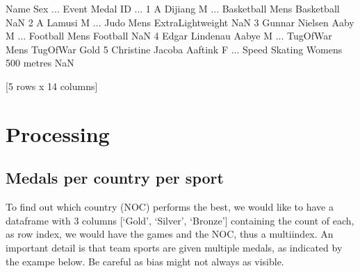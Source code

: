 \documentclass[letterpaper,10pt,english]{jupyterBook}
\begin{document}
\begin{sphinxVerbatim}[commandchars=\\\{\}]
  
\end{sphinxVerbatim}

\begin{sphinxVerbatim}[commandchars=\\\{\}]
                        Name Sex  ...                             Event  Medal
ID                                ...                                         
1                  A Dijiang   M  ...       Basketball Men\PYGZsq{}s Basketball    NaN
2                   A Lamusi   M  ...      Judo Men\PYGZsq{}s Extra\PYGZhy{}Lightweight    NaN
3        Gunnar Nielsen Aaby   M  ...           Football Men\PYGZsq{}s Football    NaN
4       Edgar Lindenau Aabye   M  ...       Tug\PYGZhy{}Of\PYGZhy{}War Men\PYGZsq{}s Tug\PYGZhy{}Of\PYGZhy{}War   Gold
5   Christine Jacoba Aaftink   F  ...  Speed Skating Women\PYGZsq{}s 500 metres    NaN

[5 rows x 14 columns]
\end{sphinxVerbatim}


\section{Processing}
\label{\detokenize{c7_case_studies/Olympics:processing}}

\subsection{Medals per country per sport}
\label{\detokenize{c7_case_studies/Olympics:medals-per-country-per-sport}}
\sphinxAtStartPar
To find out which country (NOC) performs the best, we would like to have a dataframe with 3 columns {[}‘Gold’, ‘Silver’, ‘Bronze’{]} containing the count of each, as row index, we would have the games and the NOC, thus a multiindex.
An important detail is that team sports are given multiple medals, as indicated by the exampe below. Be careful as bias might not always as visible.

\begin{sphinxVerbatim}[commandchars=\\\{\}]
\PYG{p}{[}  \PYG{p}{]}
\end{sphinxVerbatim}
\end{document}
